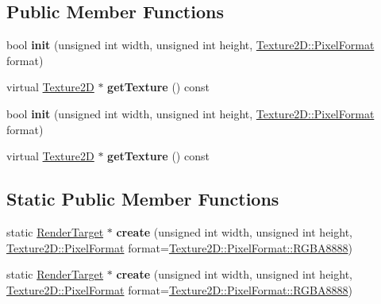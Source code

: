 \subsection*{Public Member Functions}
\begin{DoxyCompactItemize}
\item 
\mbox{\label{classexperimental_1_1RenderTarget_a2dcecd1464bfc2f0720fd148d59670db}} 
bool {\bfseries init} (unsigned int width, unsigned int height, \hyperlink{classTexture2D_a45d9d8bb5a0669def36bbdfbfb91d220}{Texture2\+D\+::\+Pixel\+Format} format)
\item 
\mbox{\label{classexperimental_1_1RenderTarget_ac5490e016d1ef58e2c6d3310af0d4fa9}} 
virtual \hyperlink{classTexture2D}{Texture2D} $\ast$ {\bfseries get\+Texture} () const
\item 
\mbox{\label{classexperimental_1_1RenderTarget_a2dcecd1464bfc2f0720fd148d59670db}} 
bool {\bfseries init} (unsigned int width, unsigned int height, \hyperlink{classTexture2D_a45d9d8bb5a0669def36bbdfbfb91d220}{Texture2\+D\+::\+Pixel\+Format} format)
\item 
\mbox{\label{classexperimental_1_1RenderTarget_ac5490e016d1ef58e2c6d3310af0d4fa9}} 
virtual \hyperlink{classTexture2D}{Texture2D} $\ast$ {\bfseries get\+Texture} () const
\end{DoxyCompactItemize}
\subsection*{Static Public Member Functions}
\begin{DoxyCompactItemize}
\item 
\mbox{\label{classexperimental_1_1RenderTarget_a47f210a2ff2e7886661e2d977902f140}} 
static \hyperlink{classexperimental_1_1RenderTarget}{Render\+Target} $\ast$ {\bfseries create} (unsigned int width, unsigned int height, \hyperlink{classTexture2D_a45d9d8bb5a0669def36bbdfbfb91d220}{Texture2\+D\+::\+Pixel\+Format} format=\hyperlink{classTexture2D_a45d9d8bb5a0669def36bbdfbfb91d220a165f06116e7b8d9b2481dfc805db4619}{Texture2\+D\+::\+Pixel\+Format\+::\+R\+G\+B\+A8888})
\item 
\mbox{\label{classexperimental_1_1RenderTarget_a740c81c76677125296bceb866941d14e}} 
static \hyperlink{classexperimental_1_1RenderTarget}{Render\+Target} $\ast$ {\bfseries create} (unsigned int width, unsigned int height, \hyperlink{classTexture2D_a45d9d8bb5a0669def36bbdfbfb91d220}{Texture2\+D\+::\+Pixel\+Format} format=\hyperlink{classTexture2D_a45d9d8bb5a0669def36bbdfbfb91d220a165f06116e7b8d9b2481dfc805db4619}{Texture2\+D\+::\+Pixel\+Format\+::\+R\+G\+B\+A8888})
\end{DoxyCompactItemize}
